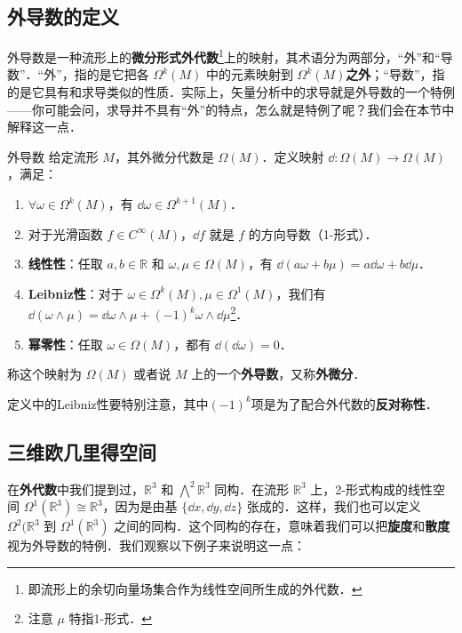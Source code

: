 

\subsection{外导数的定义}

外导数是一种流形上的\textbf{微分形式外代数}\footnote{即流形上的余切向量场集合作为线性空间所生成的外代数．}上的映射，其术语分为两部分，“外”和“导数”．“外”，指的是它把各 $\Omega^k(M)$ 中的元素映射到 $\Omega^k(M)$\textbf{之外}；“导数”，指的是它具有和求导类似的性质．实际上，矢量分析中的求导就是外导数的一个特例——你可能会问，求导并不具有“外”的特点，怎么就是特例了呢？我们会在本节中解释这一点．

\begin{definition}{外导数}\label{ExtDer_def1}
给定流形 $M$，其外微分代数是 $\Omega (M)$．定义映射 $\dd:\Omega (M)\rightarrow\Omega (M)$，满足：
\begin{enumerate}
\item $\forall \omega\in\Omega^k(M)$，有 $\dd \omega\in\Omega^{k+1}(M)$．
\item 对于光滑函数 $f\in C^\infty(M)$，$\dd f$ 就是 $f$ 的方向导数（1-形式）．
\item \textbf{线性性}：任取 $a, b\in \mathbb{R}$ 和 $\omega, \mu\in\Omega(M)$，有 $\dd(a\omega+b\mu)=a\dd\omega+b\dd\mu$．
\item \textbf{Leibniz性}：对于 $\omega\in\Omega^k(M), \mu\in\Omega^1(M)$，我们有 $\dd(\omega\wedge\mu)=\dd\omega\wedge\mu+(-1)^k\omega\wedge\dd\mu$\footnote{注意 $\mu$ 特指1-形式．}．
\item \textbf{幂零性}：任取 $\omega\in\Omega(M)$，都有 $\dd(\dd\omega)=0$．
\end{enumerate}
称这个映射为 $\Omega (M)$ 或者说 $M$ 上的一个\textbf{外导数}，又称\textbf{外微分}．
\end{definition}

定义中的Leibniz性要特别注意，其中$(-1)^k$项是为了配合外代数的\textbf{反对称性}．



\subsection{三维欧几里得空间}

在\textbf{外代数}中我们提到过，$\mathbb{R}^3$ 和 $\bigwedge^2\mathbb{R}^3$ 同构．在流形 $\mathbb{R}^3$ 上，2-形式构成的线性空间 $\Omega^1(\mathbb{R}^3)\cong\mathbb{R}^3$，因为是由基 $\{\dd x, \dd y, \dd z\}$ 张成的．这样，我们也可以定义 $\Omega^2(\mathbb{R}^3$ 到 $\Omega^1(\mathbb{R}^3)$ 之间的同构．这个同构的存在，意味着我们可以把\textbf{旋度}和\textbf{散度}视为外导数的特例．我们观察以下例子来说明这一点：

